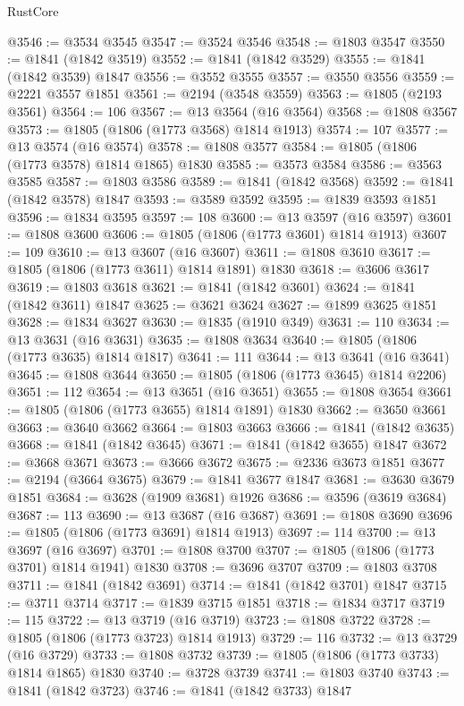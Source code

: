 \begin{lexlean}{RustCore}
\begin{coremodule}
@3546 := @3534 @3545
@3547 := @3524 @3546
@3548 := @1803 @3547
@3550 := @1841 (@1842 @3519)
@3552 := @1841 (@1842 @3529)
@3555 := @1841 (@1842 @3539) @1847
@3556 := @3552 @3555
@3557 := @3550 @3556
@3559 := @2221 @3557 @1851
@3561 := @2194 (@3548 @3559)
@3563 := @1805 (@2193 @3561)
@3564 := 106
@3567 := @13 @3564 (@16 @3564)
@3568 := @1808 @3567
@3573 := @1805 (@1806 (@1773 @3568) @1814 @1913)
@3574 := 107
@3577 := @13 @3574 (@16 @3574)
@3578 := @1808 @3577
@3584 := @1805 (@1806 (@1773 @3578) @1814 @1865) @1830
@3585 := @3573 @3584
@3586 := @3563 @3585
@3587 := @1803 @3586
@3589 := @1841 (@1842 @3568)
@3592 := @1841 (@1842 @3578) @1847
@3593 := @3589 @3592
@3595 := @1839 @3593 @1851
@3596 := @1834 @3595
@3597 := 108
@3600 := @13 @3597 (@16 @3597)
@3601 := @1808 @3600
@3606 := @1805 (@1806 (@1773 @3601) @1814 @1913)
@3607 := 109
@3610 := @13 @3607 (@16 @3607)
@3611 := @1808 @3610
@3617 := @1805 (@1806 (@1773 @3611) @1814 @1891) @1830
@3618 := @3606 @3617
@3619 := @1803 @3618
@3621 := @1841 (@1842 @3601)
@3624 := @1841 (@1842 @3611) @1847
@3625 := @3621 @3624
@3627 := @1899 @3625 @1851
@3628 := @1834 @3627
@3630 := @1835 (@1910 @349)
@3631 := 110
@3634 := @13 @3631 (@16 @3631)
@3635 := @1808 @3634
@3640 := @1805 (@1806 (@1773 @3635) @1814 @1817)
@3641 := 111
@3644 := @13 @3641 (@16 @3641)
@3645 := @1808 @3644
@3650 := @1805 (@1806 (@1773 @3645) @1814 @2206)
@3651 := 112
@3654 := @13 @3651 (@16 @3651)
@3655 := @1808 @3654
@3661 := @1805 (@1806 (@1773 @3655) @1814 @1891) @1830
@3662 := @3650 @3661
@3663 := @3640 @3662
@3664 := @1803 @3663
@3666 := @1841 (@1842 @3635)
@3668 := @1841 (@1842 @3645)
@3671 := @1841 (@1842 @3655) @1847
@3672 := @3668 @3671
@3673 := @3666 @3672
@3675 := @2336 @3673 @1851
@3677 := @2194 (@3664 @3675)
@3679 := @1841 @3677 @1847
@3681 := @3630 @3679 @1851
@3684 := @3628 (@1909 @3681) @1926
@3686 := @3596 (@3619 @3684)
@3687 := 113
@3690 := @13 @3687 (@16 @3687)
@3691 := @1808 @3690
@3696 := @1805 (@1806 (@1773 @3691) @1814 @1913)
@3697 := 114
@3700 := @13 @3697 (@16 @3697)
@3701 := @1808 @3700
@3707 := @1805 (@1806 (@1773 @3701) @1814 @1941) @1830
@3708 := @3696 @3707
@3709 := @1803 @3708
@3711 := @1841 (@1842 @3691)
@3714 := @1841 (@1842 @3701) @1847
@3715 := @3711 @3714
@3717 := @1839 @3715 @1851
@3718 := @1834 @3717
@3719 := 115
@3722 := @13 @3719 (@16 @3719)
@3723 := @1808 @3722
@3728 := @1805 (@1806 (@1773 @3723) @1814 @1913)
@3729 := 116
@3732 := @13 @3729 (@16 @3729)
@3733 := @1808 @3732
@3739 := @1805 (@1806 (@1773 @3733) @1814 @1865) @1830
@3740 := @3728 @3739
@3741 := @1803 @3740
@3743 := @1841 (@1842 @3723)
@3746 := @1841 (@1842 @3733) @1847

\end{coremodule}
\end{lexlean}
